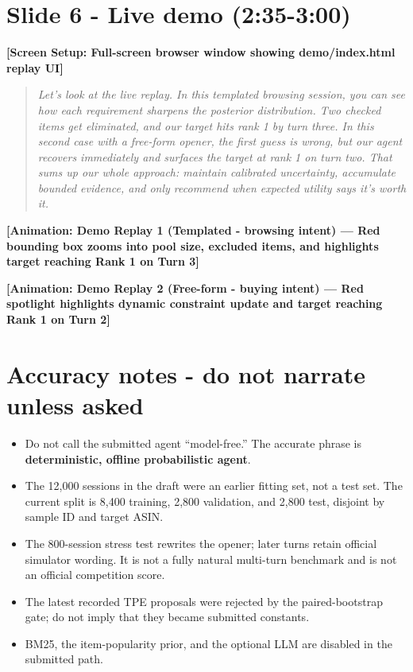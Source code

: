 \documentclass[11pt]{article}
\newenvironment{narration}{\begin{quote}\itshape}{\end{quote}}
\begin{document}
\section*{Slide 6 - Live demo (2:35-3:00)}

\textbf{[Screen Setup: Full-screen browser window showing demo/index.html replay UI]}

\begin{narration}
Let's look at the live replay. In this templated browsing session, you can see how each requirement
sharpens the posterior distribution. Two checked items get eliminated, and our target hits rank 1 by turn
three. In this second case with a free-form opener, the first guess is wrong, but our agent recovers
immediately and surfaces the target at rank 1 on turn two. That sums up our whole approach: maintain
calibrated uncertainty, accumulate bounded evidence, and only recommend when expected utility says it's
worth it.
\end{narration}

\textbf{[Animation: Demo Replay 1 (Templated - browsing intent) --- Red bounding box zooms into pool size, excluded items, and highlights target reaching Rank 1 on Turn 3]}

\textbf{[Animation: Demo Replay 2 (Free-form - buying intent) --- Red spotlight highlights dynamic constraint update and target reaching Rank 1 on Turn 2]}

\section*{Accuracy notes - do not narrate unless asked}

\begin{itemize}
\item Do not call the submitted agent ``model-free.'' The accurate phrase is \textbf{deterministic,
offline probabilistic agent}.
\item The 12,000 sessions in the draft were an earlier fitting set, not a test set. The current split
is 8,400 training, 2,800 validation, and 2,800 test, disjoint by sample ID and target ASIN.
\item The 800-session stress test rewrites the opener; later turns retain official simulator wording.
It is not a fully natural multi-turn benchmark and is not an official competition score.
\item The latest recorded TPE proposals were rejected by the paired-bootstrap gate; do not imply
that they became submitted constants.
\item BM25, the item-popularity prior, and the optional LLM are disabled in the submitted path.
\end{itemize}
\end{document}
